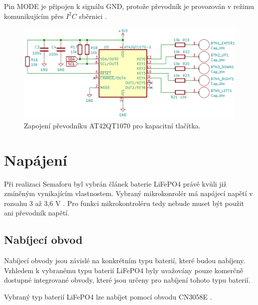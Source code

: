 Pin MODE je připojen k signálu GND, protože převodník je provozován v režimu komunikujícím přes $I^2C$ sběrnici \cite{conv_cap_but_AT42QT1070_dtsh}.


\begin{figure}[!h]
    \begin{center}
      \includegraphics[scale=0.4]{obrazky/AT42QT1070.png}
    \end{center}
    \caption[Zapojení převodníku AT42QT1070 pro kapacitní tlačítka]{Zapojení převodníku AT42QT1070 pro kapacitní tlačítka.}
\end{figure}

\section{Napájení}
Při realizaci Semaforu byl vybrán článek baterie LiFePO4 právě kvůli již zmíněným vynikajícím vlastnostem. Vybraný mikrokonrolér má napájecí napětí 
v rozsahu 3 až 3,6 V \cite{ESP_C3_dtsh}. 
Pro funkci mikrokontroléru tedy nebude muset být použit ani převodník napětí.  


\subsection{Nabíjecí obvod}
Nabíjecí obvody jsou závislé na konkrétním typu baterií, které budou nabíjeny. Vzhledem k vybranému typu baterií LiFePO4 byly uvažovány pouze komerčně
dostupné integrované obvody, které jsou určeny pro nabíjení tohoto typu baterií. 

Vybraný typ baterií LiFePO4 lze nabíjet pomocí obvodu CN3058E \cite{charger_dtsh}. 


